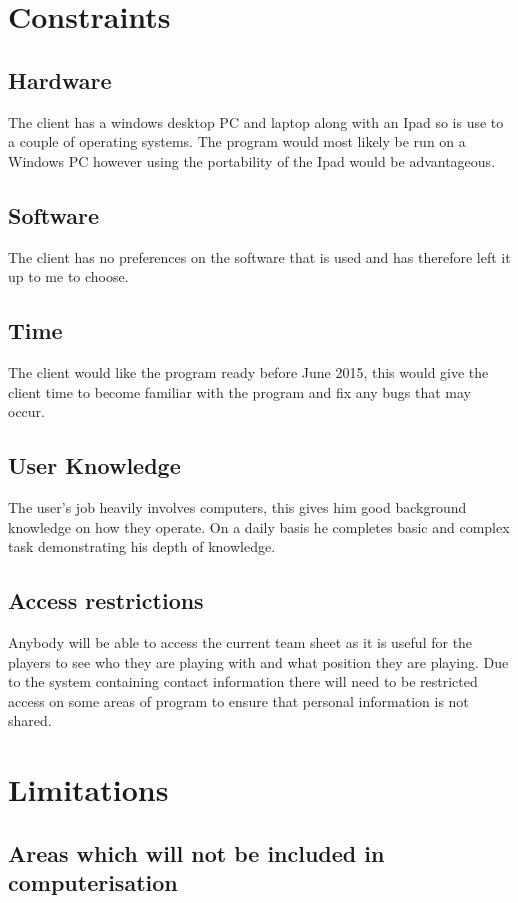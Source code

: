 \section{Constraints}

\subsection{Hardware}
The client has a windows desktop PC and laptop along with an Ipad so is use to a couple of operating systems. The program would most likely be run on a Windows PC however using the portability of the Ipad would be advantageous.
\subsection{Software}
The client has no preferences on the software that is used and has therefore left it up to me to choose.  
\subsection{Time}
The client would like the program ready before June 2015, this would give the client time to become familiar with the program and fix any bugs that may occur. 
\subsection{User Knowledge}
The user's job heavily involves computers, this gives him good background knowledge on how they operate. On a daily basis he completes basic and complex task demonstrating his depth of knowledge. 
\subsection{Access restrictions}
Anybody will be able to access the current team sheet as it is useful for the players to see who they are playing with and what position they are playing. Due to the system containing contact information there will need to be restricted access on some areas of program to ensure that personal information is not shared.   

\section{Limitations}

\subsection{Areas which will not be included in computerisation}

